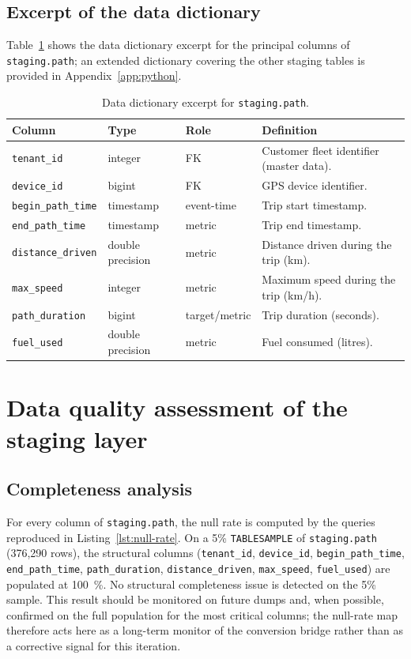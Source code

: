 \subsection{Excerpt of the data dictionary}
Table~\ref{tab:dict-path} shows the data dictionary excerpt for the principal columns of \texttt{staging.path}; an extended dictionary covering the other staging tables is provided in Appendix~\ref{app:python}.

\begin{table}[h]
\centering
\caption{Data dictionary excerpt for \texttt{staging.path}.}
\label{tab:dict-path}
\begin{tabular}{|l|l|l|p{5cm}|}
\hline
\textbf{Column} & \textbf{Type} & \textbf{Role} & \textbf{Definition} \\
\hline
\texttt{tenant\_id} & integer & FK & Customer fleet identifier (master data). \\
\texttt{device\_id} & bigint  & FK & GPS device identifier. \\
\texttt{begin\_path\_time} & timestamp & event-time & Trip start timestamp. \\
\texttt{end\_path\_time}   & timestamp & metric & Trip end timestamp. \\
\texttt{distance\_driven}  & double precision & metric & Distance driven during the trip (km). \\
\texttt{max\_speed}        & integer  & metric & Maximum speed during the trip (km/h). \\
\texttt{path\_duration}    & bigint   & target/metric & Trip duration (seconds). \\
\texttt{fuel\_used}        & double precision & metric & Fuel consumed (litres). \\
\hline
\end{tabular}
\end{table}

\section{Data quality assessment of the staging layer}

\subsection{Completeness analysis}
For every column of \texttt{staging.path}, the null rate is computed by the queries reproduced in Listing~\ref{lst:null-rate}. On a 5\% \texttt{TABLESAMPLE} of \texttt{staging.path} (376{,}290 rows), the structural columns (\texttt{tenant\_id}, \texttt{device\_id}, \texttt{begin\_path\_time}, \texttt{end\_path\_time}, \texttt{path\_duration}, \texttt{distance\_driven}, \texttt{max\_speed}, \texttt{fuel\_used}) are populated at 100~\%. No structural completeness issue is detected on the 5\% sample. This result should be monitored on future dumps and, when possible, confirmed on the full population for the most critical columns; the null-rate map therefore acts here as a long-term monitor of the conversion bridge rather than as a corrective signal for this iteration.

